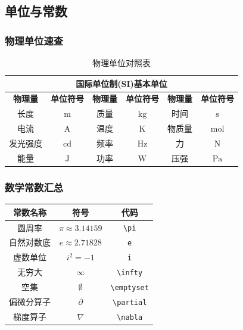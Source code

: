 \documentclass{article}
\begin{document}
\subsection{单位与常数}

\subsubsection{物理单位速查}
\begin{table}[h]
\centering
\renewcommand{\arraystretch}{1.3}
\begin{tabular}{||c|c||c|c||c|c||}
\hline\hline
\multicolumn{6}{||c||}{\textbf{国际单位制(SI)基本单位}} \\
\hline\hline
\textbf{物理量} & \textbf{单位符号} & \textbf{物理量} & \textbf{单位符号} & \textbf{物理量} & \textbf{单位符号} \\
\hline
长度 & $\text{m}$ & 质量 & $\text{kg}$ & 时间 & $\text{s}$ \\
\hline
电流 & $\text{A}$ & 温度 & $\text{K}$ & 物质量 & $\text{mol}$ \\
\hline
发光强度 & $\text{cd}$ & 频率 & $\text{Hz}$ & 力 & $\text{N}$ \\
\hline
能量 & $\text{J}$ & 功率 & $\text{W}$ & 压强 & $\text{Pa}$ \\
\hline\hline
\end{tabular}
\caption{物理单位对照表}
\end{table}

\subsubsection{数学常数汇总}
\begin{center}
\large
\begin{tabular}{@{}ccc@{}}
\toprule
\textbf{常数名称} & \textbf{符号} & \textbf{代码} \\
\midrule
圆周率 & $\pi \approx 3.14159$ & \verb|\pi| \\
自然对数底 & $e \approx 2.71828$ & \verb|e| \\
虚数单位 & $i^2 = -1$ & \verb|i| \\
无穷大 & $\infty$ & \verb|\infty| \\
空集 & $\emptyset$ & \verb|\emptyset| \\
偏微分算子 & $\partial$ & \verb|\partial| \\
梯度算子 & $\nabla$ & \verb|\nabla| \\
\bottomrule
\end{tabular}
\end{center}
\end{document}
